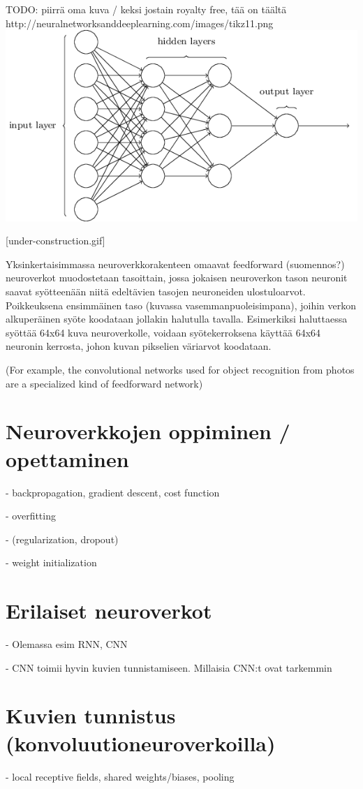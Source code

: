 \documentclass[11pt]{article}
\theoremstyle{plain}
\theoremstyle{definition}
\begin{document}
   TODO: piirrä oma kuva / keksi jostain royalty free, tää on täältä http://neuralnetworksanddeeplearning.com/images/tikz11.png
   \includegraphics[scale=0.5]{basic-neuralnet}

   [under-construction.gif]

   Yksinkertaisimmassa neuroverkkorakenteen omaavat feedforward (suomennos?) neuroverkot muodostetaan tasoittain, jossa jokaisen neuroverkon tason neuronit saavat syötteenään niitä edeltävien tasojen neuroneiden ulostuloarvot. Poikkeuksena ensimmäinen taso (kuvassa vasemmanpuoleisimpana), joihin verkon alkuperäinen syöte koodataan jollakin halutulla tavalla. Esimerkiksi haluttaessa syöttää 64x64 kuva neuroverkolle, voidaan syötekerroksena käyttää 64x64 neuronin kerrosta, johon kuvan pikselien väriarvot koodataan.

   (For example, the convolutional networks used for object recognition from photos are a specialized kind of feedforward network)
   
   \section{Neuroverkkojen oppiminen / opettaminen}
   - backpropagation, gradient descent, cost function

   - overfitting

   - (regularization, dropout)

   - weight initialization

   \section{Erilaiset neuroverkot}
   - Olemassa esim RNN, CNN

   - CNN toimii hyvin kuvien tunnistamiseen. Millaisia CNN:t ovat tarkemmin
   \section{Kuvien tunnistus (konvoluutioneuroverkoilla)}
   - local receptive fields, shared weights/biases, pooling

   \renewcommand{\refname}{Lähteet}
   
   

  
\end{document}

